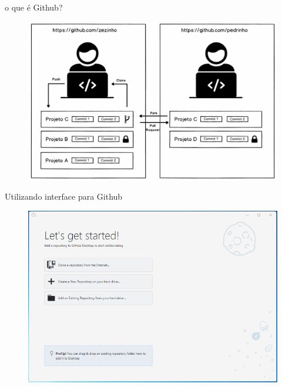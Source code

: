 \documentclass[12pt]{beamer}
\begin{document}


\begin{frame}{o que é Github?}
	\begin{figure}[!htb]
    	\centering
		\includegraphics[scale=0.3]{figuras/fig11.png} 
	\end{figure}
\end{frame}


\begin{frame}{Utilizando interface para Github}
	\begin{figure}[!htb]
    	\centering
		\includegraphics[scale=0.7]{figuras/fig12.png} 
	\end{figure}
\end{frame}
\end{document}
